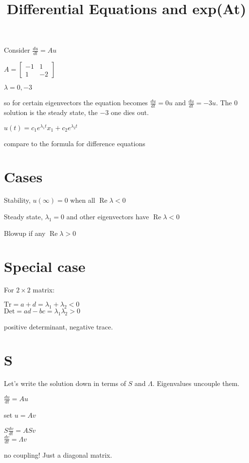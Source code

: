 \documentclass{article}
\title{Differential Equations and exp(At)}
\date{}
\renewcommand\Re{\operatorname{Re}}
\begin{document}
\maketitle

Consider $\frac{du}{dt} = Au$

$A = \begin{bmatrix}
-1 & 1 \\
1 & -2
\end{bmatrix}$

$\lambda = 0,-3$

so for certain eigenvectors the equation becomes $\frac{du}{dt} = 0u$ and $\frac{du}{dt} = -3u$. The $0$ solution is the steady state, the $-3$ one dies out.

$u(t) = c_1 e^{\lambda_1 t}x_1 + c_2 e^{\lambda_2 t}$

compare to the formula for difference equations

\section{Cases}

Stability, $u(\infty) = 0$ when all $\Re \lambda < 0$

Steady state, $\lambda_1 = 0$ and other eigenvectors have $\Re \lambda < 0$

Blowup if any $\Re \lambda > 0$

\section{Special case}

For $2 \times 2$ matrix:

$\mathrm{Tr} = a + d = \lambda_1 + \lambda_2 < 0$
\\
$\mathrm{Det} = ad - bc = \lambda_1\lambda_2> 0$

positive determinant, negative trace.

\section{S}

Let's write the solution down in terms of $S$ and $\Lambda$. Eigenvalues uncouple them.

$\frac{du}{dt} = Au$

set $u = Av$

$S \frac{dv}{dt} = ASv$ \\
$\frac{dv}{dt} = \Lambda v$

no coupling! Just a diagonal matrix.
\end{document}
